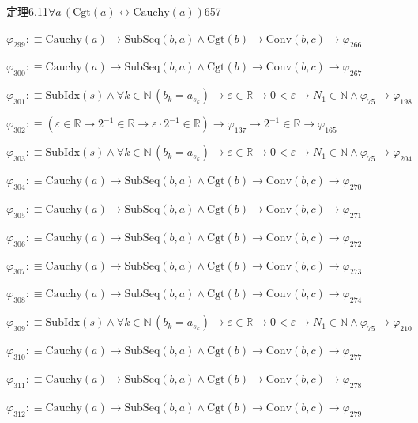 \begin{fullproof}{定理6.11}{$\forall a\,(\mathrm{Cgt}(a) \leftrightarrow \mathrm{Cauchy}(a))$}{657}
\begin{abbrevlist}
\item $\varphi_{299} :\equiv \mathrm{Cauchy}(a) \to \mathrm{SubSeq}(b,a) \land \mathrm{Cgt}(b) \to \mathrm{Conv}(b,c) \to \varphi_{266}$
\item $\varphi_{300} :\equiv \mathrm{Cauchy}(a) \to \mathrm{SubSeq}(b,a) \land \mathrm{Cgt}(b) \to \mathrm{Conv}(b,c) \to \varphi_{267}$
\item $\varphi_{301} :\equiv \mathrm{SubIdx}(s) \land \forall k \in \mathbb{N}\,(b_{k} = a_{s_{k}}) \to \varepsilon \in \mathbb{R} \to 0 < \varepsilon \to N_{1} \in \mathbb{N} \land \varphi_{75} \to \varphi_{198}$
\item $\varphi_{302} :\equiv (\varepsilon \in \mathbb{R} \to 2^{-1} \in \mathbb{R} \to \varepsilon \cdot 2^{-1} \in \mathbb{R}) \to \varphi_{137} \to 2^{-1} \in \mathbb{R} \to \varphi_{165}$
\item $\varphi_{303} :\equiv \mathrm{SubIdx}(s) \land \forall k \in \mathbb{N}\,(b_{k} = a_{s_{k}}) \to \varepsilon \in \mathbb{R} \to 0 < \varepsilon \to N_{1} \in \mathbb{N} \land \varphi_{75} \to \varphi_{204}$
\item $\varphi_{304} :\equiv \mathrm{Cauchy}(a) \to \mathrm{SubSeq}(b,a) \land \mathrm{Cgt}(b) \to \mathrm{Conv}(b,c) \to \varphi_{270}$
\item $\varphi_{305} :\equiv \mathrm{Cauchy}(a) \to \mathrm{SubSeq}(b,a) \land \mathrm{Cgt}(b) \to \mathrm{Conv}(b,c) \to \varphi_{271}$
\item $\varphi_{306} :\equiv \mathrm{Cauchy}(a) \to \mathrm{SubSeq}(b,a) \land \mathrm{Cgt}(b) \to \mathrm{Conv}(b,c) \to \varphi_{272}$
\item $\varphi_{307} :\equiv \mathrm{Cauchy}(a) \to \mathrm{SubSeq}(b,a) \land \mathrm{Cgt}(b) \to \mathrm{Conv}(b,c) \to \varphi_{273}$
\item $\varphi_{308} :\equiv \mathrm{Cauchy}(a) \to \mathrm{SubSeq}(b,a) \land \mathrm{Cgt}(b) \to \mathrm{Conv}(b,c) \to \varphi_{274}$
\item $\varphi_{309} :\equiv \mathrm{SubIdx}(s) \land \forall k \in \mathbb{N}\,(b_{k} = a_{s_{k}}) \to \varepsilon \in \mathbb{R} \to 0 < \varepsilon \to N_{1} \in \mathbb{N} \land \varphi_{75} \to \varphi_{210}$
\item $\varphi_{310} :\equiv \mathrm{Cauchy}(a) \to \mathrm{SubSeq}(b,a) \land \mathrm{Cgt}(b) \to \mathrm{Conv}(b,c) \to \varphi_{277}$
\item $\varphi_{311} :\equiv \mathrm{Cauchy}(a) \to \mathrm{SubSeq}(b,a) \land \mathrm{Cgt}(b) \to \mathrm{Conv}(b,c) \to \varphi_{278}$
\item $\varphi_{312} :\equiv \mathrm{Cauchy}(a) \to \mathrm{SubSeq}(b,a) \land \mathrm{Cgt}(b) \to \mathrm{Conv}(b,c) \to \varphi_{279}$

\end{abbrevlist}
\end{fullproof}
